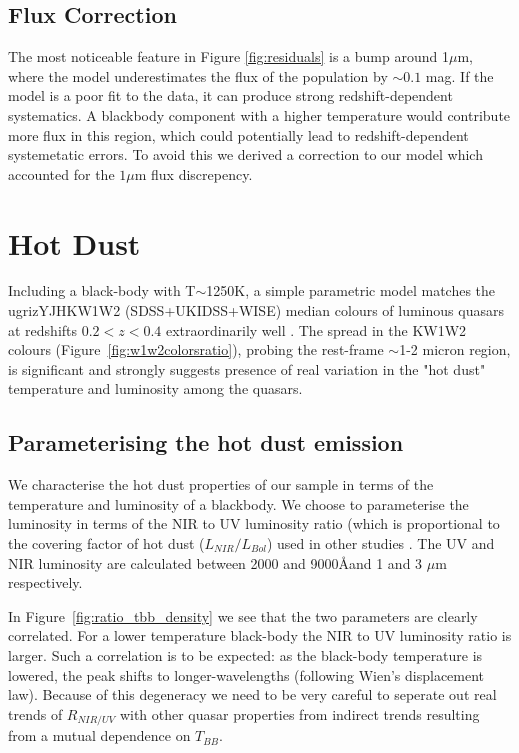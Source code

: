 \subsection{Flux Correction}

The most noticeable feature in Figure \ref{fig:residuals} is a bump around 1$\mu$m, where the model underestimates the flux of the population by $\sim 0.1$ mag. 
If the model is a poor fit to the data, it can produce strong redshift-dependent systematics. 
A blackbody component with a higher temperature would contribute more flux in this region, which could potentially lead to redshift-dependent systemetatic errors. 
To avoid this we derived a correction to our model which accounted for the $1 \mu$m flux discrepency. 

\section{Hot Dust}

Including a black-body with T$\sim$1250K, a simple parametric model matches the ugrizYJHKW1W2 (SDSS+UKIDSS+WISE) median colours of luminous quasars at redshifts $0.2 < z < 0.4$ extraordinarily well . 
The spread in the KW1W2 colours (Figure~\ref{fig:w1w2colorsratio}), probing the rest-frame $\sim$1-2 micron region, is significant and strongly suggests presence of real variation in the "hot dust" temperature and luminosity among the quasars. 

\subsection{Parameterising the hot dust emission}

We characterise the hot dust properties of our sample in terms of the temperature and luminosity of a blackbody.  
We choose to parameterise the luminosity in terms of the NIR to UV luminosity ratio (which is proportional to the covering factor of hot dust ($L_{NIR}/L_{Bol}$) used in other studies \citep{roseboom13}. 
The UV and NIR luminosity are calculated between 2000 and 9000\AA and 1 and 3 $\mu$m respectively.

In Figure~\ref{fig:ratio_tbb_density} we see that the two parameters are clearly correlated. 
For a lower temperature black-body the NIR to UV luminosity ratio is larger. 
Such a correlation is to be expected: as the black-body temperature is lowered, the peak shifts to longer-wavelengths (following Wien's displacement law). 
Because of this degeneracy we need to be very careful to seperate out real trends of $R_{NIR/UV}$ with other quasar properties from indirect trends resulting from a mutual dependence on $T_{BB}$.  

